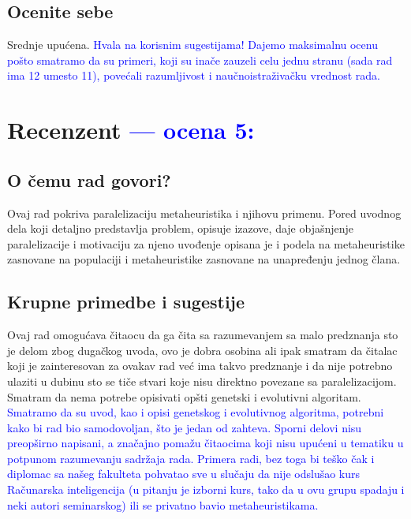 \documentclass[a4paper]{report}
\newcommand{\odgovor}[1]{\textcolor{blue}{#1}}
\begin{document}
\section{Ocenite sebe}
Srednje upućena. \odgovor{Hvala na korisnim sugestijama! Dajemo maksimalnu ocenu pošto smatramo da su primeri, koji su inače zauzeli celu jednu stranu (sada rad ima 12 umesto 11), povećali razumljivost i naučnoistraživačku vrednost rada.}

\chapter{Recenzent \odgovor{--- ocena 5:} }


\section{O čemu rad govori?}
Ovaj rad pokriva paralelizaciju metaheuristika i njihovu primenu. Pored uvodnog dela koji detaljno predstavlja problem, opisuje izazove, daje objašnjenje paralelizacije i motivaciju za njeno uvođenje opisana je i podela na metaheuristike zasnovane na populaciji  i  metaheuristike zasnovane na unapređenju jednog člana. 
\section{Krupne primedbe i sugestije}

Ovaj rad omogućava čitaocu da ga čita sa razumevanjem sa malo predznanja sto je delom zbog dugačkog uvoda, ovo je dobra osobina ali ipak smatram da čitalac koji je zainteresovan za ovakav rad već ima takvo predznanje i da nije potrebno ulaziti u dubinu sto se tiče stvari koje nisu direktno povezane sa paralelizacijom. Smatram da nema potrebe opisivati opšti genetski i evolutivni algoritam.
\odgovor{Smatramo da su uvod, kao i opisi genetskog i evolutivnog algoritma, potrebni kako bi rad bio samodovoljan, što je jedan od zahteva. Sporni delovi nisu preopširno napisani, a značajno pomažu čitaocima koji nisu upućeni u tematiku u potpunom razumevanju sadržaja rada. Primera radi, bez toga bi teško čak i diplomac sa našeg fakulteta pohvatao sve u slučaju da nije odslušao kurs Računarska inteligencija (u pitanju je izborni kurs, tako da u ovu grupu spadaju i neki autori seminarskog) ili se privatno bavio metaheuristikama.}
\end{document}
